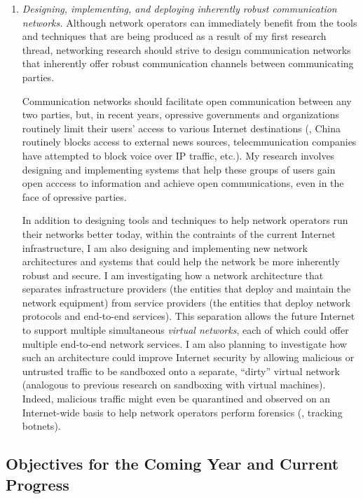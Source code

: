 \begin{enumerate}
\item {\em Designing, implementing, and deploying inherently robust
communication networks.}  Although network operators can immediately
benefit from the tools and techniques that are being produced as a
result of my first research thread, networking research should strive to
design communication networks that inherently offer robust communication
channels between communicating parties.  

Communication networks should facilitate open communication between any
two parties, but, in recent years, opressive governments and
organizations routinely limit their users' access to various Internet
destinations (\eg, China routinely blocks access to external news
sources, telecmmunication companies have attempted to block voice over
IP traffic, etc.).  My research involves designing and implementing
systems that help these groups of users gain open acccess to
information and achieve open communications, even in the face of
opressive parties.

In addition to designing tools and techniques to help network operators
run their networks better today, within the contraints of the current
Internet infrastructure, I am also designing and implementing new
network architectures and systems that could help the network be more
inherently robust and secure.  I am investigating how a network
architecture that separates infrastructure providers (the entities that
deploy and maintain the network equipment) from service providers (the
entities that deploy network protocols and end-to-end services). This
separation allows the future Internet to support multiple simultaneous
{\em virtual networks\/}, each of which could offer multiple end-to-end
network services.  I am also planning to investigate how such an
architecture could improve Internet security by allowing malicious or
untrusted traffic to be sandboxed onto a separate, ``dirty'' virtual
network (analogous to previous research on sandboxing with virtual
machines).  Indeed, malicious traffic might even be quarantined and
observed on an Internet-wide basis to help network operators perform
forensics (\eg, tracking botnets).
\end{enumerate}

\noindent 

\subsection*{Objectives for the Coming Year and Current Progress}

